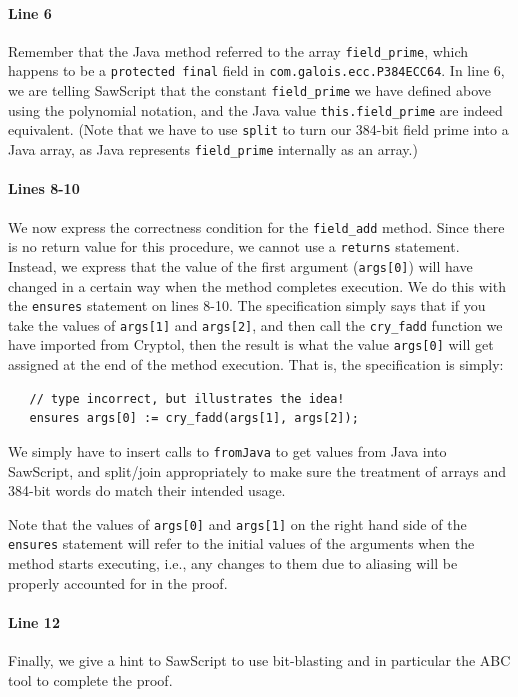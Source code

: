 \documentclass[12pt]{galois-whitepaper}
\newcommand{\sawScript}{{\sc SawScript}\xspace}
\begin{document}
\paragraph{Line 6} Remember that the Java method referred to the array {\tt field\_prime}, which happens to be a {\tt protected final}
field in {\tt com.galois.ecc.P384ECC64}. In line 6, we are telling \sawScript that the constant {\tt field\_prime}
we have defined above using the polynomial notation, and the Java value {\tt this.field\_prime} are indeed equivalent.
(Note that we have to use {\tt split} to turn our 384-bit field prime into a Java array, as Java represents {\tt field\_prime}
internally as an array.)

\paragraph{Lines 8-10} We now express the correctness condition for the {\tt field\_add} method. Since there is no return value for this
procedure, we cannot use a {\tt returns} statement. Instead, we express that the value of the first argument ({\tt args[0]}) will have 
changed in a certain way when the method completes execution. We do this with the {\tt ensures} statement on lines 8-10.
The specification simply says that if you take the values of {\tt args[1]} and
{\tt args[2]}, and then call the {\tt cry\_fadd} function we have imported from Cryptol,
then the result is what the value {\tt args[0]} will get assigned at the end of the method execution. That is, the
specification is simply:
\begin{Verbatim}
   // type incorrect, but illustrates the idea!
   ensures args[0] := cry_fadd(args[1], args[2]);
\end{Verbatim}
We simply have to insert calls to {\tt fromJava} to get values from Java into \sawScript, and split/join appropriately
to make sure the treatment of arrays and 384-bit words do match their intended usage. 

Note that the values of {\tt args[0]} and {\tt args[1]}
on the right hand side of the {\tt ensures} statement will refer to the initial values of the arguments when the method starts executing,
i.e., any changes to them due to aliasing will be properly accounted for in the proof.

\paragraph{Line 12} Finally, we give a hint to \sawScript to use bit-blasting and in particular the ABC tool to complete the proof. 
\end{document}
